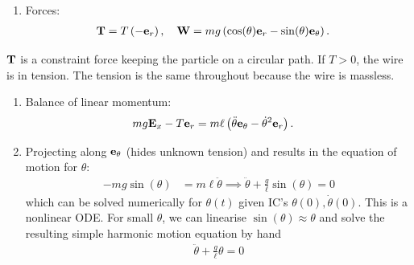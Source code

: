 \documentclass[
  letterpaper,
  DIV=11,
  numbers=noendperiod]{scrreprt}
\providecommand{\tightlist}{%
  \setlength{\itemsep}{0pt}\setlength{\parskip}{0pt}}
\newcommand{\lp}{\left(}
\newcommand{\rp}{\right)}
\begin{document}
\begin{enumerate}
\def\labelenumi{\arabic{enumi}.}
\setcounter{enumi}{1}
\tightlist
\item
  Forces: \begin{align*}
   {\bf T} &= T\lp-{\bf e}_r\rp, \quad {\bf W} = mg\lp\cos(\theta){\bf e}_r-\sin(\theta){\bf e}_\theta\rp.
  \end{align*}
\end{enumerate}

\begin{tcolorbox}[enhanced jigsaw, arc=.35mm, bottomrule=.15mm, bottomtitle=1mm, breakable, colback=white, colbacktitle=quarto-callout-note-color!10!white, colframe=quarto-callout-note-color-frame, coltitle=black, left=2mm, leftrule=.75mm, opacityback=0, opacitybacktitle=0.6, rightrule=.15mm, title=\textcolor{quarto-callout-note-color}{\faInfo}\hspace{0.5em}{Remark: Tension}, titlerule=0mm, toprule=.15mm, toptitle=1mm]

\({\bf T}\) is a constraint force keeping the particle on a circular
path. If \(T>0\), the wire is in tension. The tension is the same
throughout because the wire is massless.

\end{tcolorbox}

\begin{enumerate}
\def\labelenumi{\arabic{enumi}.}
\setcounter{enumi}{2}
\item
  Balance of linear momentum: \begin{align*}
   mg{\bf E}_x-T{\bf e}_r &= m\ell\lp\ddot{\theta}{\bf e}_\theta-\dot{\theta}^2{\bf e}_r\rp.
  \end{align*}
\item
  Projecting along \({\bf e}_\theta\) (hides unknown tension) and
  results in the equation of motion for \(\theta\): \begin{align*}
   -mg\sin(\theta) &= m\ell\ddot{\theta} \implies \ddot{\theta}+\frac{g}{\ell}\sin(\theta) = 0
  \end{align*} which can be solved numerically for \(\theta(t)\) given
  IC's \(\theta(0), \dot{\theta}(0)\). This is a nonlinear ODE. For
  small \(\theta\), we can linearise \(\sin(\theta)\approx \theta\) and
  solve the resulting simple harmonic motion equation by hand
  \begin{align*}
   \ddot{\theta}+\frac{g}{\ell}\theta = 0
  \end{align*}
\end{enumerate}
\end{document}
